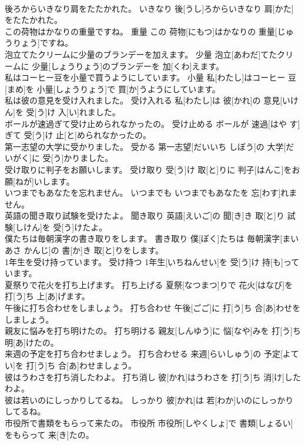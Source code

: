\documentclass[8pt]{extreport}
\begin{document}
\begin{CJK}{UTF8}{min}
\\	後ろからいきなり肩をたたかれた。	いきなり	後[うし]ろからいきなり 肩[かた]をたたかれた。	
\\	この荷物はかなりの重量ですね。	重量	この 荷物[にもつ]はかなりの 重量[じゅうりょう]ですね。	
\\	泡立てたクリームに少量のブランデーを加えます。	少量	泡立[あわだ]てたクリームに 少量[しょうりょう]のブランデーを 加[くわ]えます。	
\\	私はコーヒー豆を小量で買うようにしています。	小量	私[わたし]はコーヒー 豆[まめ]を 小量[しょうりょう]で 買[か]うようにしています。	
\\	私は彼の意見を受け入れました。	受け入れる	私[わたし]は 彼[かれ]の 意見[いけん]を 受[う]け 入[い]れました。	
\\	ボールが速過ぎて受け止められなかったの。	受け止める	ボールが 速過[はや す]ぎて 受[う]け 止[と]められなかったの。	
\\	第一志望の大学に受かりました。	受かる	第一志望[だいいち しぼう]の 大学[だいがく]に 受[う]かりました。	
\\	受け取りに判子をお願いします。	受け取り	受[う]け 取[と]りに 判子[はんこ]をお 願[ねが]いします。	
\\	いつまでもあなたを忘れません。	いつまでも	いつまでもあなたを 忘[わす]れません。	
\\	英語の聞き取り試験を受けたよ。	聞き取り	英語[えいご]の 聞[き]き 取[と]り 試験[しけん]を 受[う]けたよ。	
\\	僕たちは毎朝漢字の書き取りをします。	書き取り	僕[ぼく]たちは 毎朝漢字[まいあさ かんじ]の 書[か]き 取[と]りをします。	
\\	1年生を受け持っています。	受け持つ	1年生[いちねんせい]を 受[う]け 持[も]っています。	
\\	夏祭りで花火を打ち上げます。	打ち上げる	夏祭[なつまつ]りで 花火[はなび]を 打[う]ち 上[あ]げます。	
\\	午後に打ち合わせをしましょう。	打ち合わせ	午後[ごご]に 打[う]ち 合[あ]わせをしましょう。	
\\	親友に悩みを打ち明けたの。	打ち明ける	親友[しんゆう]に 悩[なや]みを 打[う]ち 明[あ]けたの。	
\\	来週の予定を打ち合わせましょう。	打ち合わせる	来週[らいしゅう]の 予定[よてい]を 打[う]ち 合[あ]わせましょう。	
\\	彼はうわさを打ち消したわよ。	打ち消し	彼[かれ]はうわさを 打[う]ち 消[け]したわよ。	
\\	彼は若いのにしっかりしてるね。	しっかり	彼[かれ]は 若[わか]いのにしっかりしてるね。	
\\	市役所で書類をもらって来たの。	市役所	市役所[しやくしょ]で 書類[しょるい]をもらって 来[き]たの。	

\end{CJK}
\end{document}
